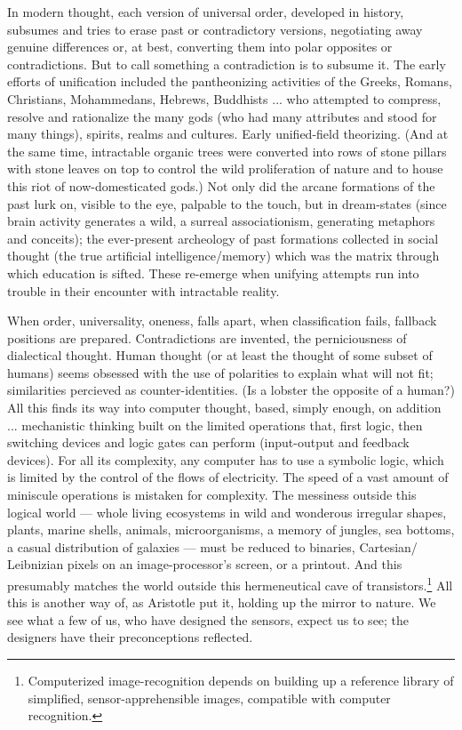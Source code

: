 In modern thought, each version of universal order, developed in history, subsumes
and tries to erase past or contradictory versions, negotiating away genuine differences
or, at best, converting them into polar opposites or contradictions. But to call something
a contradiction is to subsume it. The early
efforts of unification included the pantheonizing activities of the Greeks, Romans,
Christians, Mohammedans, Hebrews, Buddhists ... who attempted to compress, resolve and rationalize the many gods (who had many attributes and stood for many things), spirits, realms and cultures. Early
unified-field theorizing. (And at the same time, intractable organic trees were converted
into rows of stone pillars with stone leaves on top to control the wild proliferation of
nature and to house this riot of now-domesticated gods.) Not only did the arcane formations of the past lurk on, visible to the eye,
palpable to the touch, but in dream-states (since brain activity generates a wild, a surreal associationism, generating metaphors and conceits); the ever-present archeology of
past formations collected in social thought (the true artificial intelligence/memory)
which was the matrix through which education is sifted. These re-emerge when unifying attempts run into trouble in their encounter with intractable reality.

When order, universality, oneness,
falls apart, when classification fails,
fallback positions are prepared. Contradictions are
invented, the perniciousness of dialectical
thought. Human thought (or at least the
thought of some subset of humans) seems
obsessed with the use of polarities to explain
what will not fit; similarities percieved as
counter-identities. (Is a lobster the opposite
of a human?) All this finds its way into
computer thought, based, simply enough,
on addition ... mechanistic thinking built
on the limited operations that, first logic,
then switching devices and logic gates can
perform (input-output and feedback devices).
For all its complexity, any computer has to
use a symbolic logic, which is limited by the
control of the flows of electricity. The speed
of a vast amount of miniscule operations is
mistaken for complexity. The messiness outside this logical world --- 
whole living ecosystems in wild and wonderous irregular
shapes, plants, marine shells, animals,
microorganisms, a memory of jungles, sea
bottoms, a casual distribution of galaxies --- 
must be reduced to binaries, Cartesian\slash
Leibnizian pixels on an image-processor's
screen, or a printout. And this presumably
matches the world outside this hermeneutical cave 
of transistors.\footnote{Computerized image-recognition depends on building up a reference library of simplified, sensor-apprehensible images, compatible with computer recognition.} 
All this is another way of, as
Aristotle put it, holding up the mirror to
nature. We see what a few of us, who have
designed the sensors, expect us to see; the
designers have their preconceptions reflected.

